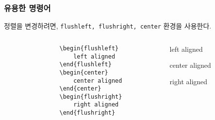 \begin{frame}[fragile]
    \frametitle{유용한 명령어}

    정렬을 변경하려면, \texttt{flushleft, flushright, center} 환경을 사용한다.


    \begin{columns}[c]
        \begin{column}{0.4\textwidth}
            \begin{verbatim}
                \begin{flushleft}
                    left aligned
                \end{flushleft}
                \begin{center}
                    center aligned
                \end{center}
                \begin{flushright}
                    right aligned
                \end{flushright}
            \end{verbatim}
        \end{column}
        \begin{column}{0.4\textwidth}
            \begin{flushleft}
                left aligned
            \end{flushleft}
            \begin{center}
                center aligned
            \end{center}
            \begin{flushright}
                right aligned
            \end{flushright}
        \end{column}
    \end{columns}

\end{frame}

